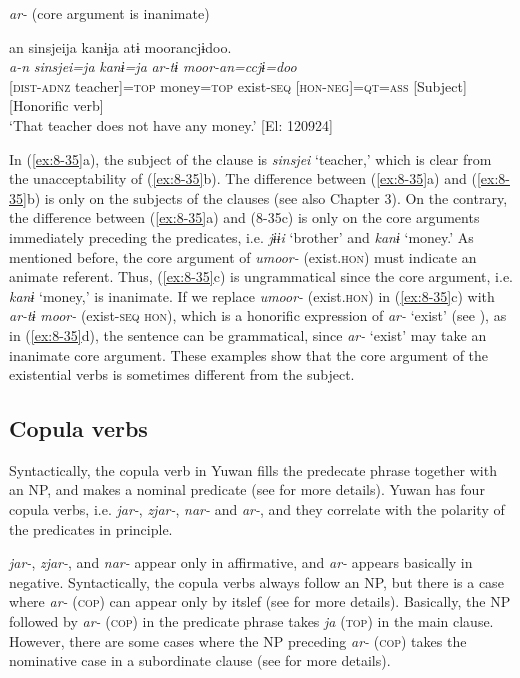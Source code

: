 \ex \textit{ar-} (core argument is inanimate)

{\TM}
\gllll  an  sinsjeija  kanɨja  atɨ  moorancjɨdoo.\\
\textit{a-n}  \textit{sinsjei=ja}  \textit{kanɨ=ja}  \textit{ar-tɨ  moor-an=ccjɨ=doo}\\
{}[\textsc{dist}-\textsc{adnz}  teacher]=\textsc{top}  money=\textsc{top}  exist-\textsc{seq}  [\textsc{hon}-\textsc{neg}]=\textsc{qt}=\textsc{ass}
{}[Subject]        [Honorific verb]\\
\glt ‘That teacher does not have any money.’ [El: 120924]
\z
\z

In (\ref{ex:8-35}a), the subject of the clause is \textit{sinsjei} ‘teacher,’ which is clear from the unacceptability of (\ref{ex:8-35}b). The difference between (\ref{ex:8-35}a) and (\ref{ex:8-35}b) is only on the subjects of the clauses (see also Chapter 3). On the contrary, the difference between (\ref{ex:8-35}a) and (8-35c) is only on the core arguments immediately preceding the predicates, i.e. \textit{jɨɨi} ‘brother’ and \textit{kanɨ} ‘money.’ As mentioned before, the core argument of \textit{umoor-} (exist.\textsc{hon}) must indicate an animate referent. Thus, (\ref{ex:8-35}c) is ungrammatical since the core argument, i.e. \textit{kanɨ} ‘money,’ is inanimate. If we replace \textit{umoor-} (exist.\textsc{hon}) in (\ref{ex:8-35}c) with \textit{ar-tɨ} \textit{moor-} (exist-\textsc{seq} \textsc{hon}), which is a honorific expression of \textit{ar-} ‘exist’ (see ), as in (\ref{ex:8-35}d), the sentence can be grammatical, since \textit{ar-} ‘exist’ may take an inanimate core argument. These examples show that the core argument of the existential verbs is sometimes different from the subject.

\subsection{Copula verbs}

Syntactically, the copula verb in Yuwan fills the predecate phrase together with an NP, and makes a nominal predicate (see  for more details). Yuwan has four copula verbs, i.e. \textit{jar-}, \textit{zjar-}, \textit{nar-} and \textit{ar-}, and they correlate with the polarity of the predicates in principle.

  \textit{jar-}, \textit{zjar-}, and \textit{nar-} appear only in affirmative, and \textit{ar-} appears basically in negative. Syntactically, the copula verbs always follow an NP, but there is a case where \textit{ar-} (\textsc{cop}) can appear only by itslef (see  for more details). Basically, the NP followed by \textit{ar-} (\textsc{cop}) in the predicate phrase takes \textit{ja} (\textsc{top}) in the main clause. However, there are some cases where the NP preceding \textit{ar-} (\textsc{cop}) takes the nominative case in a subordinate clause (see  for more details).

